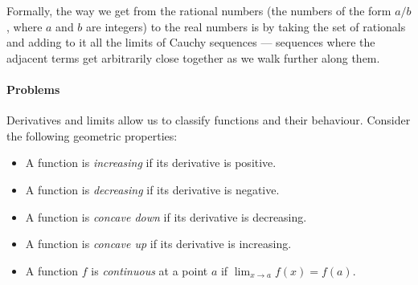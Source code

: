 Formally, the way we get from the rational numbers (the numbers of the form $ a/b $, where $ a $ and $ b $ are integers)
to the real numbers is by taking the set of rationals and adding to it all the limits of Cauchy sequences --- sequences
where the adjacent terms get arbitrarily close together as we walk further along them.

\paragraph{Problems}
Derivatives and limits allow us to classify functions and their behaviour. Consider the following geometric properties:
\begin{itemize}
  \item A function is \emph{increasing} if its derivative is positive.
  \item A function is \emph{decreasing} if its derivative is negative.
  \item A function is \emph{concave down} if its derivative is decreasing.
  \item A function is \emph{concave up} if its derivative is increasing.
  \item A function $ f $ is \emph{continuous} at a point $ a $ if $ \lim_{x \to a} f(x) = f(a) $.
\end{itemize}
